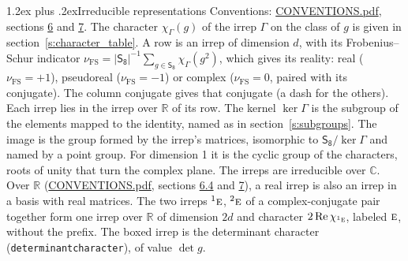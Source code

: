 \documentclass[10pt,a4paper]{article}
\makeatletter
\renewcommand\section{\@startsection{section}{1}{\z@}{-3ex plus -1ex minus -.2ex}%
  {1.2ex plus .2ex}{\normalfont\large\sffamily\bfseries\color{parttitle}}}
\numberwithin{equation}{section}
\newcommand{\grp}[1]{\mathsf{#1}}
\newcommand{\irr}[1]{\text{\normalfont\scshape #1}}
\newcommand{\conjpair}[1]{{}^{#1}}
\newcommand{\irchar}[1]{\chi_{#1}}
\newcommand{\fsind}{\nu_{\mathrm{FS}}}
\makeatother
\begin{document}
\section{Irreducible representations}\label{s:irreps}
Conventions: \href{../../CONVENTIONS.pdf}{CONVENTIONS.pdf}, sections \href{../../CONVENTIONS.pdf\#conv.6}{6} and \href{../../CONVENTIONS.pdf\#conv.7}{7}.
\leavevmode\label{n:function.character}\label{n:irrep.Gamma}The character $\irchar{\Gamma}(g)$ of the irrep $\Gamma$ on the class of $g$ is given in section~\ref{s:character_table}.
\leavevmode\label{n:index.dimension}\label{n:index.frobenius}\label{n:head.irrep}\label{n:head.reality}A row is an irrep of dimension $d$, with its Frobenius--Schur indicator $\fsind = |\grp{S_{8}}|^{-1}\allowbreak\sum_{g\in\grp{S_{8}}}\irchar{\Gamma}(g^2)$, which gives its reality: real ($\fsind = +1$), pseudoreal ($\fsind = -1$) or complex ($\fsind = 0$, paired with its conjugate). \label{n:head.conjugate}The column conjugate gives that conjugate (a dash for the others). \label{n:head.over.real}Each irrep lies in the irrep over $\mathbb{R}$ of its row. \label{n:head.kernel}The kernel $\ker\Gamma$ is the subgroup of the elements mapped to the identity, named as in section~\ref{s:subgroups}. \label{n:head.image}The image is the group formed by the irrep's matrices, isomorphic to $\grp{S_{8}}/\ker\Gamma$ and named by a point group. For dimension 1 it is the cyclic group of the characters, roots of unity that turn the complex plane. The irreps are irreducible over $\mathbb{C}$. Over $\mathbb{R}$ (\href{../../CONVENTIONS.pdf}{CONVENTIONS.pdf}, sections \href{../../CONVENTIONS.pdf\#conv.6.4}{6.4} and \href{../../CONVENTIONS.pdf\#conv.7}{7}), a real irrep is also an irrep in a basis with real matrices. The two irreps $\conjpair{1}\irr{e}$, $\conjpair{2}\irr{e}$ of a complex-conjugate pair together form one irrep over $\mathbb{R}$ of dimension $2d$ and character $2\operatorname{Re}\irchar{\conjpair{1}\irr{e}}$, labeled $\irr{e}$, without the prefix. \label{n:mark.determinant}The boxed irrep is the determinant character (\texttt{determinantcharacter}), of value $\det g$.
\setlength{\emergencystretch}{2em}\par\setlength{\emergencystretch}{0pt}
\end{document}

